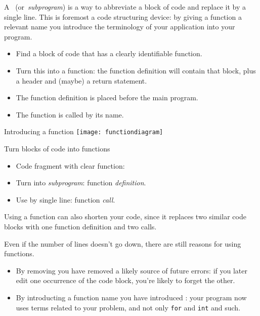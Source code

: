 
A~
(or~\emph{subprogram}) is a way to
abbreviate a block of code and replace it by a single line.
This is foremost a code structuring device: by giving a function a
relevant name you introduce the terminology of your application into
your program.

\begin{itemize}
\item Find a block of code that has a clearly identifiable function.
\item Turn this into a function: the function definition will contain
  that block, plus a header and (maybe) a return statement.
\item The function definition is placed before the main program.
\item The function is called by its name.
\end{itemize}

\begin{block}{Introducing a function}
  \label{sl:func-scheme}
  \texttt{[image: functiondiagram]}
\end{block}

\begin{slide}{Turn blocks of code into functions}
  \label{sl:function-intro}
  \begin{itemize}
  \item Code fragment with clear function:
  \item Turn into \emph{subprogram}: function \emph{definition}.
  \item Use by single line: function \emph{call}.
  \end{itemize}
\end{slide}

Using a function can also shorten your code, since it replaces two similar
code blocks with one function definition and two calls.

Even if the number of lines doesn't go down, there are still reasons
for using functions.
\begin{itemize}
\item By removing  you have removed a
  likely source of future errors: if you later edit one occurrence of
  the code block, you're likely to forget the other.
\item By introducting a function name you have introduced
  : your program now uses terms related to your
  problem, and not only \lstinline{for} and \lstinline{int} and such.
\end{itemize}

